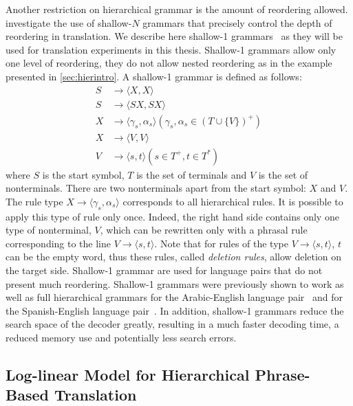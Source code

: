  Another restriction on hierarchical grammar is the amount of reordering allowed. \citet{degispert-iglesias-blackwood-banga-byrne:2010:CL} investigate the use
  of shallow-$N$ grammars that precisely control the depth of reordering in translation. We describe here 
  shallow-1 grammars~\citep{iglesias-degispert-banga-byrne:2009:EACL,degispert-iglesias-blackwood-banga-byrne:2010:CL} as
  they will be used for translation experiments in this thesis. Shallow-1 grammars
  allow only one level of reordering, they do not allow nested reordering as in the example presented in \autoref{sec:hierintro}.
  A shallow-1
  grammar is defined as follows:
%  
  \begin{align*}
    S &\rightarrow \langle X , X \rangle \\
    S &\rightarrow \langle S X , S X \rangle \\
    X &\rightarrow \langle \gamma_s , \alpha_s \rangle (\gamma_s, \alpha_s \in (T \cup \{V\})^{+}) \\
    X &\rightarrow \langle V , V \rangle \\
    V &\rightarrow \langle s , t \rangle (s \in T^{+}, t \in  T^{*})
  \end{align*}
%  
  where $S$ is the start symbol, $T$ is the set of terminals and $V$ is the set of nonterminals. There are two nonterminals
  apart from the start symbol: $X$ and $V$. The rule type $X \rightarrow \langle \gamma_s , \alpha_s \rangle$ corresponds
  to all hierarchical rules. It is possible to apply this type of rule only once. Indeed, the
  right hand side contains only one type of nonterminal, $V$, which can be rewritten only with a phrasal rule corresponding
  to the line $V \rightarrow \langle s , t \rangle$. Note that for rules of the type $V \rightarrow \langle s , t \rangle$, $t$ can be
  the empty word, thus these rules, called {\em deletion rules}, allow deletion on the target side. Shallow-1 grammar are used for language pairs that do not present
  much reordering. Shallow-1 grammars were previously shown to work as well as full hierarchical grammars
  for the Arabic-English language pair~\citep{iglesias-degispert-banga-byrne:2009:EACL} and for
  the Spanish-English language pair~\citep{iglesias-degispert-banga-byrne:2009:SEPLN}.
  In addition, shallow-1 grammars reduce the search space of the decoder greatly, resulting in a much faster decoding
  time, a reduced memory use and potentially less search errors.


    \subsection{Log-linear Model for Hierarchical Phrase-Based Translation} \label{sec:loglinear}

